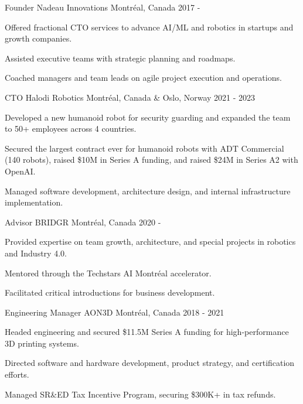 \begin{cventries}

    \cventry
    {Founder}
    {Nadeau Innovations}
    {Montréal, Canada}
    {2017 - }
    {
        \begin{cvitems}
            \item{Offered fractional CTO services to advance AI/ML and robotics in startups and growth companies.}
            \item{Assisted executive teams with strategic planning and roadmaps.}
            \item{Coached managers and team leads on agile project execution and operations.}
        \end{cvitems}
    }

    \cventry
    {CTO}
    {Halodi Robotics}
    {Montréal, Canada \& Oslo, Norway}
    {2021 - 2023}
    {
        \begin{cvitems}
            \item{Developed a new humanoid robot for security guarding and expanded the team to 50+ employees across 4 countries.}
            \item{Secured the largest contract ever for humanoid robots with ADT Commercial (140 robots), raised \$10M in Series A funding, and raised \$24M in Series A2 with OpenAI.}
            \item{Managed software development, architecture design, and internal infrastructure implementation.}
        \end{cvitems}
    }

    \cventry
    {Advisor}
    {BRIDGR}
    {Montréal, Canada}
    {2020 - }
    {
        \begin{cvitems}
            \item{Provided expertise on team growth, architecture, and special projects in robotics and Industry 4.0.}
            \item{Mentored through the Techstars AI Montréal accelerator.}
            \item{Facilitated critical introductions for business development.}
            \end{cvitems}
    }

    \cventry
    {Engineering Manager}
    {AON3D}
    {Montréal, Canada}
    {2018 - 2021}
    {
        \begin{cvitems}
            \item{Headed engineering and secured \$11.5M Series A funding for high-performance 3D printing systems.}
            \item{Directed software and hardware development, product strategy, and certification efforts.}
            \item{Managed SR\&ED Tax Incentive Program, securing \$300K+ in tax refunds.}
        \end{cvitems}
    }



\end{cventries}
